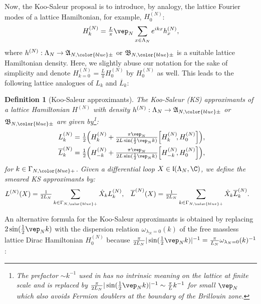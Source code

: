 \documentclass[a4paper, 11pt]{article}
\newcommand{\fA}{\mathfrak{A}}\newcommand{\cA}{\mathcal{A}}\newcommand{\dA}{\mathds{A}}\newcommand{\sA}{\mathscr{A}}
\newcommand{\fB}{\mathfrak{B}}\newcommand{\cB}{\mathcal{B}}\newcommand{\dB}{\mathds{B}}\newcommand{\sB}{\mathscr{B}}
\newcommand{\fl}{\mathfrak{l}}\newcommand{\cl}{\mathcal{l}}
\DeclareMathOperator{\1}{\mathds{1}}
\newtheorem{defn}[thm]{Definition}
\begin{document}
Now, the Koo-Saleur proposal is to introduce, by analogy, the lattice Fourier modes of a lattice Hamiltonian, for example, $H^{(N)}_{0}$:
\begin{align}
\label{eq:hdfourier}
H_k^{(N)} = \tfrac{L}{\pi}\vep_{N}\sum_{x\in \Lambda_{N}} e^{ikx} h^{(N)}_x,
\end{align}
where $h^{(N)}:\Lambda_{N}\rightarrow\fA_{N,{\color{blue}\pm}}$ or $\fB_{N,{\color{blue}\pm}}$ is a suitable lattice Hamiltonian density. Here, we slightly abuse our notation for the sake of simplicity and denote $H^{(N)}_{k=0}=\tfrac{L}{\pi}H^{(N)}_{0}$ by $H^{(N)}_{0}$ as well. This leads to the following lattice analogues of $L_k$ and $\overline{L}_{k}$:
\begin{defn}[Koo-Saleur approximants]
\label{def:KSapprox}
The \emph{Koo-Saleur (KS) approximants} of a lattice Hamiltonian $H^{(N)}$ with density $h^{(N)}:\Lambda_{N}\rightarrow\fA_{N,{\color{blue}\pm}}$ or $\fB_{N,{\color{blue}\pm}}$ are given by\footnote{The prefactor $\sim k^{-1}$ used in \cite{MilstedExtractionOfConformal} has no intrinsic meaning on the lattice at finite scale and is replaced by $\tfrac{\pi}{2L_{N}}|\sin(\tfrac{1}{2}\vep_{N}k)|^{-1}\sim\tfrac{\pi}{L}k^{-1}$ for small $\vep_{N}$ which also avoids Fermion doublers at the boundary of the Brillouin zone.}:
\begin{align}
\label{eq:latviracpt}
L_{k}^{(N)} & = \tfrac{1}{2}\Big(H_{k}^{(N)}+\tfrac{\pi\vep_{N}}{2L\sin(\frac{1}{2}\vep_{N}k)}\Big[H_{k}^{(N)}\!,H_0^{(N)}\Big]\Big), \\ \nonumber
\overline{L}_{k}^{(N)} & = \tfrac{1}{2}\Big(H_{-k}^{(N)}+\tfrac{\pi\vep_{N}}{2L\sin(\frac{1}{2}\vep_{N}k)}\Big[H_{-k}^{(N)}\!,H_0^{(N)}\Big]\Big),
\end{align}
for $k\in\Gamma_{N,{\color{blue}+}}$. Given a differential loop $X\in\fl(\Lambda_{N},\C)$, we define the smeared KS approximants by:
\begin{align}
\label{eq:latvirasmeared}
L^{(N)}(X) & = \tfrac{1}{2L_{N}}\sum_{k\in\Gamma_{N,{\color{blue}+}}}\hat{X}_{k}L_{k}^{(N)}, & \overline{L}^{(N)}(X) & = \tfrac{1}{2L_{N}}\sum_{k\in\Gamma_{N,{\color{blue}+}}}\hat{X}_{k}\overline{L}_{k}^{(N)}.
\end{align}
\end{defn}
An alternative formula for the Koo-Saleur approximants is obtained by replacing $2\sin(\tfrac{1}{2}\vep_{N}k)$ with the dispersion relation $\omega_{\lambda_{N}=0}(k)$ of the free massless lattice Dirac Hamiltonian $H^{(N)}_{0}$ because $\tfrac{\pi}{2L_{N}}|\sin(\tfrac{1}{2}\vep_{N}k)|^{-1}=\tfrac{\pi}{L_{N}}\omega_{\lambda_{N}=0}(k)^{-1}$:
\end{document}
